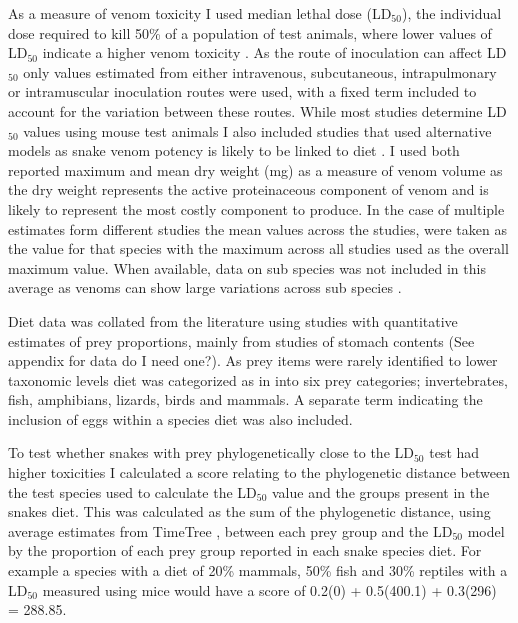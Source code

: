 As a measure of venom toxicity I used median lethal dose (LD$_{50}$), the individual dose required to kill 50\% of a population of test animals, where lower values of LD$_{50}$ indicate a higher venom toxicity \citep{chippaux1991snake}. As the route of inoculation can affect LD$_{50}$ \citep{chippaux1991snake} only values estimated from either intravenous, subcutaneous, intrapulmonary or intramuscular inoculation routes were used, with a fixed term included to account for the variation between these routes. While most studies determine LD$_{50}$ values using mouse test animals I also included studies that used alternative models as snake venom potency is likely to be linked to diet \citep{barlow2009coevolution}. I used both reported maximum and mean dry weight (mg) as a measure of venom volume as the dry weight represents the active proteinaceous component of venom and is likely to represent the most costly component to produce. In the case of multiple estimates form different studies the mean values across the studies, were taken as the value for that species with the maximum across all studies used as the overall maximum value. When available, data on sub species was not included in this average as venoms can show large variations across sub species \citep{chippaux1991snake}.


Diet data was collated from the literature using studies with quantitative estimates of prey proportions, mainly from studies of stomach contents (See appendix for data do I need one?). As prey items were rarely identified to lower taxonomic levels diet was categorized as in \citep{allen2013evolution} into six prey categories; invertebrates, fish, amphibians, lizards, birds and mammals. A separate term indicating the inclusion of eggs within a species diet was also included.


To test whether snakes with prey phylogenetically close to the LD$_{50}$ test had higher toxicities I calculated a score relating to the phylogenetic distance between the test species used to calculate the LD$_{50}$ value and the groups present in the snakes diet. This was calculated as the sum of the phylogenetic distance, using average estimates from TimeTree \citep{hedges2006timetree}, between each prey group and the LD$_{50}$ model by the proportion of each prey group reported in each snake species diet. For example a species with a diet of 20\% mammals, 50\% fish and 30\% reptiles with a LD$_{50}$ measured using mice would have a score of 0.2\*(0) + 0.5\*(400.1) + 0.3\*(296) = 288.85.


